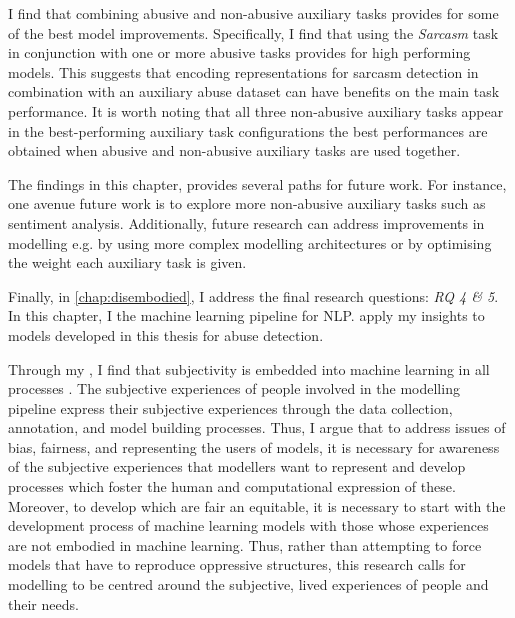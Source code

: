  I find that combining abusive and non-abusive auxiliary tasks provides for some of the best model improvements.
Specifically, I find that using the \textit{Sarcasm} task in conjunction with one or more abusive tasks provides for high performing models.
This suggests that encoding representations for sarcasm detection in combination with an auxiliary abuse dataset can have benefits on the main task performance.
It is worth noting that all three non-abusive auxiliary tasks appear in the best-performing auxiliary task configurations  the best performances are obtained when abusive and non-abusive auxiliary tasks are used together.

The findings in this chapter, provides several paths for future work.
For instance, one avenue  future work is to explore more non-abusive auxiliary tasks such as sentiment analysis.
Additionally, future research can address improvements in modelling e.g. by using more complex modelling architectures or by optimising the weight each auxiliary task is given.

Finally, in \cref{chap:disembodied}, I address the final  research questions: \textit{RQ 4 \& 5}.
In this chapter, I  the  machine learning pipeline for NLP.
 apply my insights to models developed in this thesis for abuse detection.

Through my , I find that subjectivity is embedded into machine learning in all processes .
The subjective experiences of people involved in the modelling pipeline express their subjective experiences through the data collection, annotation, and model building processes.
Thus, I argue that to address issues of bias, fairness, and representing the users of  models, it is necessary for awareness of the subjective experiences that modellers want to represent and develop processes which foster the human and computational expression of these.
Moreover, to develop which are fair an equitable, it is necessary to start with the development process of machine learning models with those whose experiences are not embodied in machine learning.
Thus, rather than attempting to force models that have  to reproduce oppressive structures, this research calls for modelling to be centred around the subjective, lived experiences of people and their needs.

